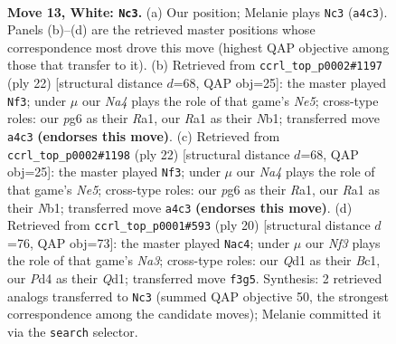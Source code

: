\documentclass[11pt]{article}
\begin{document}
\clearpage

\begin{figure}[p]\centering
\begin{subfigure}{0.46\textwidth}\centering
\resizebox{\linewidth}{!}{%
\newchessgame
\chessboard[
  setfen={rnb1k2r/pp1q2b1/3p2p1/2p2p1p/N2P4/5N2/PPP1KPPP/R1BQ2R1 w kq - 1 13},
  showmover=false,
  pgfstyle=straightmove, color=movearrow, markmove={a4-c3}
]}
\caption{}
\end{subfigure}\hfill
\begin{subfigure}{0.46\textwidth}\centering
\resizebox{\linewidth}{!}{%
\newchessgame
\chessboard[
  setfen={r1b1k2r/p1q2ppp/2pbp3/2pnN3/2P5/3P4/PP3PPP/RNBQR1K1 w kq - 1 12},
  showmover=false,
  pgfstyle=straightmove, color=movearrow, markmove={e5-f3}
]}
\caption{}
\end{subfigure}
\\[4pt]
\begin{subfigure}{0.46\textwidth}\centering
\resizebox{\linewidth}{!}{%
\newchessgame
\chessboard[
  setfen={r1b1k2r/p1q2ppp/2pbp3/2pnN3/2P5/3P4/PP3PPP/RNBQR1K1 w kq - 1 12},
  showmover=false,
  pgfstyle=straightmove, color=movearrow, markmove={e5-f3}
]}
\caption{}
\end{subfigure}\hfill
\begin{subfigure}{0.46\textwidth}\centering
\resizebox{\linewidth}{!}{%
\newchessgame
\chessboard[
  setfen={r1b1k2r/p1q1ppbp/2p3p1/2pnN3/8/N2P4/PPP2PPP/R1BQR1K1 w kq - 1 11},
  showmover=false,
  pgfstyle=straightmove, color=movearrow, markmove={a3-c4}
]}
\caption{}
\end{subfigure}
\caption{\textbf{Move 13, White: \texttt{Nc3}.} (a) Our position; Melanie plays \texttt{Nc3} (\texttt{a4c3}). Panels (b)--(d) are the retrieved master positions whose correspondence most drove this move (highest QAP objective among those that transfer to it). (b) Retrieved from \texttt{ccrl\_top\_p0002\#1197} (ply 22) [structural distance $d$=68, QAP obj=25]: the master played \texttt{Nf3}; under $\mu$ our \emph{Na4} plays the role of that game's \emph{Ne5}; cross-type roles: our \emph{p}g6 as their \emph{R}a1, our \emph{R}a1 as their \emph{N}b1; transferred move \texttt{a4c3} \textbf{(endorses this move)}. (c) Retrieved from \texttt{ccrl\_top\_p0002\#1198} (ply 22) [structural distance $d$=68, QAP obj=25]: the master played \texttt{Nf3}; under $\mu$ our \emph{Na4} plays the role of that game's \emph{Ne5}; cross-type roles: our \emph{p}g6 as their \emph{R}a1, our \emph{R}a1 as their \emph{N}b1; transferred move \texttt{a4c3} \textbf{(endorses this move)}. (d) Retrieved from \texttt{ccrl\_top\_p0001\#593} (ply 20) [structural distance $d$=76, QAP obj=73]: the master played \texttt{Nac4}; under $\mu$ our \emph{Nf3} plays the role of that game's \emph{Na3}; cross-type roles: our \emph{Q}d1 as their \emph{B}c1, our \emph{P}d4 as their \emph{Q}d1; transferred move \texttt{f3g5}. Synthesis: 2 retrieved analogs transferred to \texttt{Nc3} (summed QAP objective 50, the strongest correspondence among the candidate moves); Melanie committed it via the \texttt{search} selector.}
\label{fig:thought-m24}
\end{figure}
\end{document}
